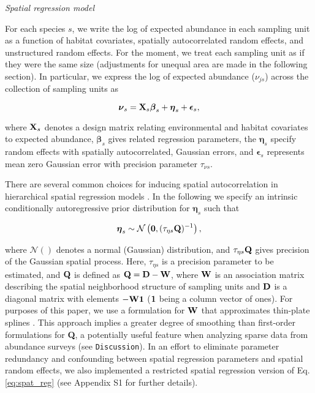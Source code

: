 \documentclass[12pt,fleqn]{article}
\begin{document}
\begin{flushleft}
\vspace{.15in}
{\it Spatial regression model} \\
\vspace{.15in}

\hspace{.5in}For each species $s$, we write the log of expected abundance in each sampling unit as a function
of habitat covariates, spatially autocorrelated random effects, and unstructured random effects. For the moment, we treat each sampling unit as if they were the same size (adjustments for unequal area are made in the following section).  In particular, we express the log of expected abundance ($\nu_{js}$) across the collection of sampling units as
\begin{linenomath*}
\begin{equation}
 \label{eq:spat_reg}
 \boldsymbol{\nu}_s = {\bf X}_s \boldsymbol{\beta}_s + \boldsymbol{\eta}_s + \boldsymbol{\epsilon}_s,
\end{equation}
\end{linenomath*}
where ${\bf X}_s$ denotes a design matrix relating environmental and habitat covariates to expected abundance, $\boldsymbol{\beta}_s$ gives related regression parameters, the $\boldsymbol{\eta}_s$ specify random effects with spatially autocorrelated, Gaussian errors, and $\boldsymbol{\epsilon}_s$ represents mean zero Gaussian error with precision parameter $\tau_{\nu s}$.

\hspace{.5in}There are several common choices for inducing spatial autocorrelation in hierarchical spatial regression models \citep[see e.g.][]{Banerjee2004}. In the following we specify an intrinsic conditionally autoregressive prior distribution \citep[ICAR;][]{BesagKooperberg1995,RueHeld2005} for $\boldsymbol{\eta}_s$ such  that
\begin{linenomath*}
\begin{equation*}
 \boldsymbol{\eta}_s \sim \mathcal{N}\left( {\bf 0},(\tau_{\eta s}{\bf Q})^{-1} \right),
\end{equation*}
\end{linenomath*}
where $\mathcal{N}()$ denotes a normal (Gaussian) distribution, and $\tau_{\eta s}{\bf Q}$ gives precision of the Gaussian spatial process.  Here, $\tau_{\eta s}$  is a precision parameter to be estimated, and ${\bf Q}$ is defined as ${\bf Q}={\bf D}-{\bf W}$, where ${\bf W}$ is an association matrix describing the spatial neighborhood structure of sampling units and ${\bf D}$ is a diagonal matrix with elements $-{\bf W} {\bf 1}$ (${\bf 1}$ being a column vector of ones).  For purposes of this paper, we use a formulation for ${\bf W}$ that approximates thin-plate splines \citep[][section 3.4.2]{RueHeld2005}.  This approach implies a greater degree of smoothing than first-order formulations for {\bf Q}, a potentially useful feature when analyzing sparse data from abundance surveys (see \texttt{Discussion}).  In an effort to eliminate parameter redundancy and confounding between spatial regression parameters and spatial random effects, we also implemented a restricted spatial regression \citep[RSR;][]{ReichEtAl2006,HodgesReich2010,HughesHaran2013} version of Eq. \ref{eq:spat_reg} (see Appendix S1 for further details).



\end{flushleft}
\end{document}
